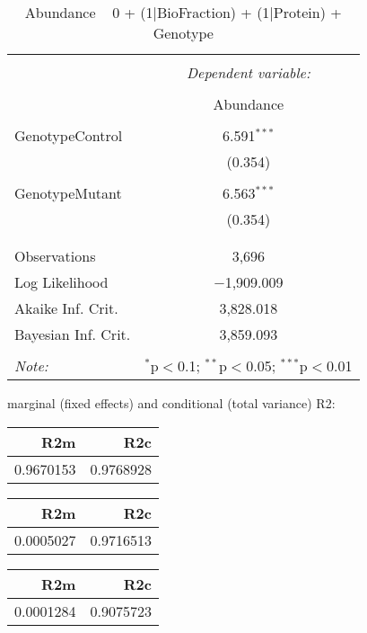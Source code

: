 \documentclass[11pt]{report}
\begin{document}
\begin{table}[!htbp] \centering 
  \caption{Abundance ~ 0 + (1|BioFraction) + (1|Protein) + Genotype} 
  \label{} 
\begin{tabular}{@{\extracolsep{5pt}}lc} 
\\[-1.8ex]\hline 
\hline \\[-1.8ex] 
 & \multicolumn{1}{c}{\textit{Dependent variable:}} \\ 
\cline{2-2} 
\\[-1.8ex] & Abundance \\ 
\hline \\[-1.8ex] 
 GenotypeControl & 6.591$^{***}$ \\ 
  & (0.354) \\ 
  & \\ 
 GenotypeMutant & 6.563$^{***}$ \\ 
  & (0.354) \\ 
  & \\ 
\hline \\[-1.8ex] 
Observations & 3,696 \\ 
Log Likelihood & $-$1,909.009 \\ 
Akaike Inf. Crit. & 3,828.018 \\ 
Bayesian Inf. Crit. & 3,859.093 \\ 
\hline 
\hline \\[-1.8ex] 
\textit{Note:}  & \multicolumn{1}{r}{$^{*}$p$<$0.1; $^{**}$p$<$0.05; $^{***}$p$<$0.01} \\ 
\end{tabular} 
\end{table} 
marginal (fixed effects) and conditional (total variance) R2:

\begin{tabular}{r|r}
\hline
R2m & R2c\\
\hline
0.9670153 & 0.9768928\\
\hline
\end{tabular}

\begin{tabular}{r|r}
\hline
R2m & R2c\\
\hline
0.0005027 & 0.9716513\\
\hline
\end{tabular}

\begin{tabular}{r|r}
\hline
R2m & R2c\\
\hline
0.0001284 & 0.9075723\\
\hline
\end{tabular}
\end{document}
